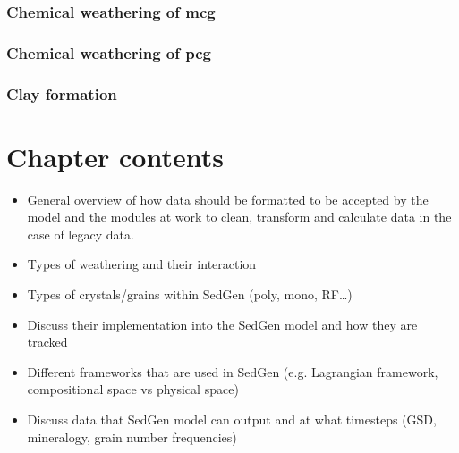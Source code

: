         \subsubsection{Chemical weathering of mcg}

        \subsubsection{Chemical weathering of pcg}


        \subsubsection{Clay formation}

\section{Chapter contents}
\begin{itemize}
    \item General overview of how data should be formatted to be accepted by the model and the modules at work to clean, transform and calculate data in the case of legacy data.
    \item Types of weathering and their interaction
    \item Types of crystals/grains within SedGen (poly, mono, RF…)
    \item Discuss their implementation into the SedGen model and how they are tracked
    \item Different frameworks that are used in SedGen (e.g. Lagrangian framework, compositional space vs physical space)
    \item Discuss data that SedGen model can output and at what timesteps (GSD, mineralogy, grain number frequencies)

\end{itemize}



\cleardoublepage

